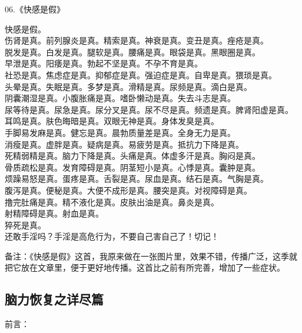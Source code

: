 \documentclass{ctexart}
\begin{document}
\begin{center}
    06.《快感是假》\it

    快感是假。 \\ 伤肾是真。前列腺炎是真。精索是真。神衰是真。变丑是真。痤疮是真。 \\ 脱发是真。白发是真。腿软是真。腰痛是真。眼袋是真。黑眼圈是真。 \\ 早泄是真。阳痿是真。勃起不坚是真。不孕不育是真。 \\ 社恐是真。焦虑症是真。抑郁症是真。强迫症是真。自卑是真。猥琐是真。 \\ 头晕是真。失眠是真。多梦是真。滑精是真。尿频是真。滴白是真。 \\ 阴囊潮湿是真。小腹胀痛是真。嗜卧懒动是真。失去斗志是真。 \\ 尿等待是真。尿急是真。尿分叉是真。尿不尽是真。频遗是真。脾肾阳虚是真。 \\ 耳鸣是真。肤色晦暗是真。双眼无神是真。身体发臭是真。 \\ 手脚易发麻是真。健忘是真。晨勃质量差是真。全身无力是真。 \\ 消瘦是真。虚胖是真。疑病是真。易疲劳是真。抵抗力下降是真。 \\ 死精弱精是真。脑力下降是真。头痛是真。体虚多汗是真。胸闷是真。 \\ 骨质疏松是真。发育障碍是真。阴茎短小是真。心悸是真。囊肿是真。 \\ 烦躁易怒是真。蛋疼是真。舌裂是真。尿血是真。结石是真。气胸是真。 \\ 腹泻是真。便秘是真。大便不成形是真。腰突是真。对视障碍是真。 \\ 撸完肚痛是真。精不液化是真。皮肤出油是真。鼻炎是真。 \\ 射精障碍是真。射血是真。 \\ 猝死是真。 \\ 还敢手淫吗？手淫是高危行为，不要自己害自己了！切记！
\end{center}

备注：《快感是假》这首，我原来做在一张图片里，效果不错，传播广泛，这季就把它放在文章里，便于更好地传播。这首比之前有所完善，增加了一些症状。

\subsection{脑力恢复之详尽篇}

前言：
\end{document}

